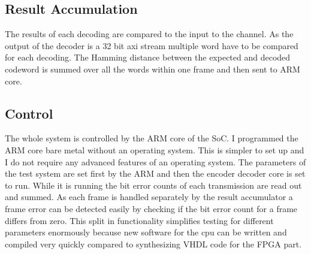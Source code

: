 \subsection{Result Accumulation}
The results of each decoding are compared to the input to the channel. As the output of the decoder is a 32 bit axi stream multiple word have to be compared for each decoding. The Hamming distance between the expected and decoded codeword is summed over all the words within one frame and then sent to ARM core.

\subsection{Control}
The whole system is controlled by the ARM core of the SoC. I programmed the ARM core bare metal without an operating system. This is simpler to set up and I do not require any advanced features of an operating system. The parameters of the test system are set first by the ARM and then the encoder decoder core is set to run. While it is running the bit error counts of each transmission are read out and summed. As each frame is handled separately by the result accumulator a frame error can be detected easily by checking if the bit error count for a frame differs from zero. This split in functionality simplifies testing for different parameters enormously because new software for the cpu can be written and compiled very quickly compared to synthesizing VHDL code for the FPGA part.


